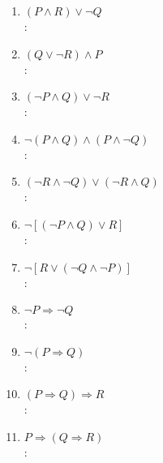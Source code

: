 \begin{enumerate}[label=0.1.\arabic*]
\begin{enumerate}[label=\arabic*)]
		\item $ (P \wedge R) \vee \neg Q $ \\
		\solucion: \\
		
		\item $ (Q \vee \neg R) \wedge P $ \\
		\solucion: \\
		
		\item $ ( \neg P \wedge Q ) \vee \neg R $ \\
		\solucion: \\
		
		\item $ \neg ( P \wedge Q ) \wedge (P \wedge \neg Q) $ \\
		\solucion: \\
		
		\item $ (\neg R \wedge \neg Q) \vee (\neg R \wedge Q) $ \\
		\solucion: \\
		
		\item $ \neg [ ( \neg P \wedge Q ) \vee R ] $ \\
		\solucion: \\
		
		\item $ \neg [ R \vee ( \neg Q \wedge \neg P ) ] $ \\
		\solucion: \\
		
		\item $ \neg P \Rightarrow \neg Q $ \\
		\solucion: \\
		
		\item $ \neg (P \Rightarrow Q) $ \\
		\solucion: \\
		
		\item $ ( P \Rightarrow Q ) \Rightarrow R $ \\
		\solucion: \\
		
		\item $ P \Rightarrow ( Q \Rightarrow R ) $ \\
		\solucion: \\
		

\end{enumerate}
\end{enumerate}
